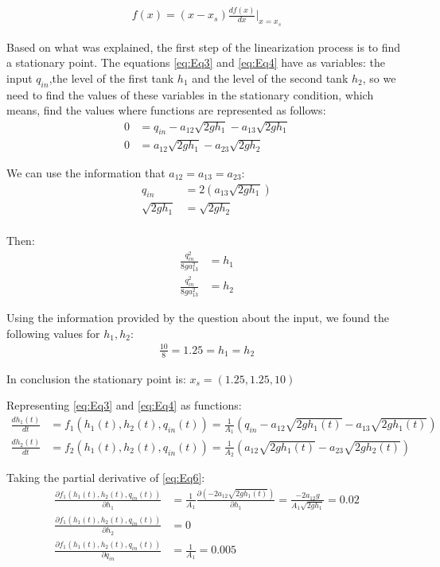 \documentclass[a4paper,11pt]{article}
\begin{document}
\begin{align}
\label{eq:Eq5}
f(x) = (x-x_s)\frac{df(x)}{dx}\Big\vert_{x=x_s}
\end{align}
\par Based on what was explained, the first step of the linearization process is to find a stationary point. The equations \eqref{eq:Eq3} and \eqref{eq:Eq4} have as variables: the input $q_{in}$,the level of the first tank $h_1$ and the level of the second tank $h_2$, so we need to find the values of these variables in the stationary condition, which means, find the values where functions are represented as follows:
\begin{align*}
0 &=  q_{in}-a_{12}\sqrt{2gh_1}-a_{13}\sqrt{2gh_1}\\
0 &= a_{12}\sqrt{2gh_1}-a_{23}\sqrt{2gh_2}
\end{align*}
\par We can use the information that $a_{12}=a_{13}=a_{23}$:
\begin{align*}
q_{in} &= 2(a_{13}\sqrt{2gh_1})\\
\sqrt{2gh_1}&=\sqrt{2gh_2}\\
\end{align*}
\par Then:
\begin{align*}
\frac{q_{in}^2}{8ga_{13}^2}&=h_1\\
\frac{q_{in}^2}{8ga_{13}^2}&=h_2
\end{align*}
\par Using the information provided by the question about the input, we found the following values for $h_1,h_2$:
\begin{align}
\frac{10}{8}=1.25=h_1=h_2
\end{align}
\par In conclusion the stationary point is: $x_s=(1.25,1.25,10)$
\par Representing \eqref{eq:Eq3} and \eqref{eq:Eq4} as functions:
\begin{align}
\label{eq:Eq6}
\frac{dh_1(t)}{dt}&=f_1(h_1(t),h_2(t),q_{in}(t))= \frac{1}{A_1}(q_{in}-a_{12}\sqrt{2gh_1(t)}-a_{13}\sqrt{2gh_1(t)})\\
\label{eq:Eq7}
\frac{dh_2(t)}{dt}&=f_2(h_1(t),h_2(t),q_{in}(t))= \frac{1}{A_2}(a_{12}\sqrt{2gh_1(t)}-a_{23}\sqrt{2gh_2(t)})
\end{align}
\par Taking the partial derivative of \eqref{eq:Eq6}:
\begin{align*}
\frac{\partial f_1(h_1(t),h_2(t),q_{in}(t))}{\partial h_1}&= \frac{1}{A_1}\frac{\partial(-2a_{12}\sqrt{2gh_1(t)})}{\partial h_1}=\frac{-2a_{12}g}{
A_1\sqrt{2gh_1}}=0.02\\
\frac{\partial f_1(h_1(t),h_2(t),q_{in}(t))}{\partial h_2}&=0\\
\frac{\partial f_1(h_1(t),h_2(t),q_{in}(t))}{\partial q_{in}}&=\frac{1}{A_1}=0.005
\end{align*}
\end{document}

